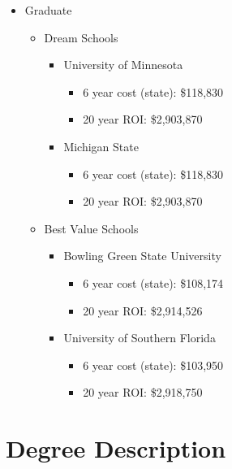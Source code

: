 \begin{itemize}
    \item{Graduate} 
    \begin{itemize}
        \item{Dream Schools}
            \begin{itemize}
                \item{University of Minnesota}
                    \begin{itemize}
                        \item{6 year cost (state):} \$118,830 
                        \item{20 year ROI:} \$2,903,870 
                    \end{itemize}
                \item{Michigan State}
                    \begin{itemize}
                        \item{6 year cost (state):} \$118,830
                        \item{20 year ROI:} \$2,903,870
                    \end{itemize}
            \end{itemize}
        \item{Best Value Schools} 
            \begin{itemize}
                \item{Bowling Green State University}
                    \begin{itemize}
                        \item{6 year cost (state):} \$108,174 
                        \item{20 year ROI:} \$2,914,526 
                    \end{itemize}
                \item{University of Southern Florida}
                    \begin{itemize}
                        \item{6 year cost (state):} \$103,950 
                        \item{20 year ROI:} \$2,918,750 
                    \end{itemize}
            \end{itemize}
    \end{itemize}
\end{itemize}

\section{Degree Description}
